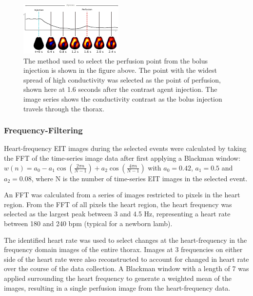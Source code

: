 \begin{figure}[H]
\centering
\includegraphics[width=\textwidth]{chapter3-perfusion_analysis/imgs/fig-methodsBolus.pdf}
\caption[Selection of the bolus signal]{
The method used to select the perfusion point from the bolus injection is shown 
in the figure above. The point with the widest spread of high conductivity was 
selected as the point of perfusion, shown here at 1.6 seconds after the contrast 
agent injection. The image series shows the conductivity contrast as the bolus 
injection travels through the thorax.
}
\label{fig:methodsBolus}
\end{figure}


\subsubsection{Frequency-Filtering} \label{freqVent}

Heart-frequency EIT images during the selected events were calculated 
by taking the FFT of the time-series image data after first applying a Blackman window: 
$w(n)=a_{0}-a_{1}\cos \left({\frac {2\pi n}{N-1}}\right)+a_{2}\cos \left({\frac {4\pi n}{N-1}}\right)$ 
with $a_{0} = 0.42$, $a_{1} = 0.5$ and $a_{2} = 0.08$, where N is the number of time-series 
EIT images in the selected event.

An FFT was calculated from a series of images restricted to pixels in the heart 
region. From the FFT 
of all pixels the heart region, the heart frequency was selected as the largest 
peak between 3 and 4.5 Hz, representing a heart rate between 180 
and 240 bpm (typical for a newborn lamb).

The identified heart rate was used to select changes at the heart-frequency 
in the frequency domain images of the entire thorax. 
Images at 3 frequencies on either side of the heart rate were also reconstructed 
to account for changed in heart rate over the course of the data collection.
A Blackman window with a length of 7 was applied 
surrounding the heart frequency to generate a weighted mean of the images, resulting in 
a single perfusion image from the heart-frequency data. 
 

